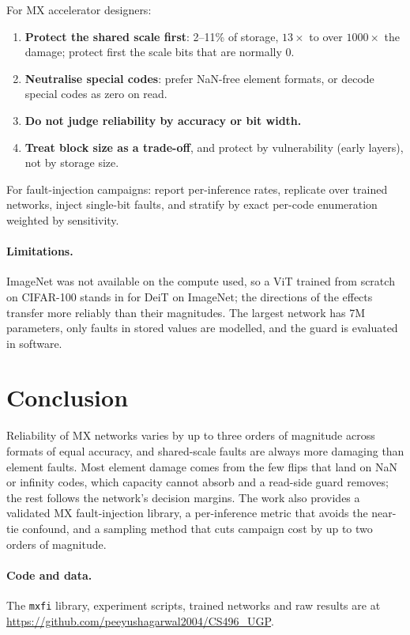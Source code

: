 \documentclass[10pt,a4paper]{article}
\begin{document}
\noindent For MX accelerator designers:
\begin{enumerate}
\item \textbf{Protect the shared scale first}: 2--11\% of storage, $13\times$ to over
$1000\times$ the damage; protect first the scale bits that are normally 0.
\item \textbf{Neutralise special codes}: prefer NaN-free element formats, or decode special codes
as zero on read.
\item \textbf{Do not judge reliability by accuracy or bit width.}
\item \textbf{Treat block size as a trade-off}, and protect by vulnerability (early layers), not
by storage size.
\end{enumerate}
For fault-injection campaigns: report per-inference rates, replicate over trained networks,
inject single-bit faults, and stratify by exact per-code enumeration weighted by sensitivity.

\paragraph{Limitations.} ImageNet was not available on the compute used, so a ViT trained from
scratch on CIFAR-100 stands in for DeiT on ImageNet; the directions of the effects transfer more
reliably than their magnitudes. The largest network has 7M parameters, only faults in stored
values are modelled, and the guard is evaluated in software.

\section{Conclusion}

Reliability of MX networks varies by up to three orders of magnitude across formats of equal
accuracy, and shared-scale faults are always more damaging than element faults. Most element
damage comes from the few flips that land on NaN or infinity codes, which capacity cannot absorb
and a read-side guard removes; the rest follows the network's decision margins. The work also
provides a validated MX fault-injection library, a per-inference metric that avoids the near-tie
confound, and a sampling method that cuts campaign cost by up to two orders of magnitude.

\paragraph{Code and data.} The \texttt{mxfi} library, experiment scripts, trained networks and
raw results are at \url{https://github.com/peeyushagarwal2004/CS496_UGP}.
\end{document}
